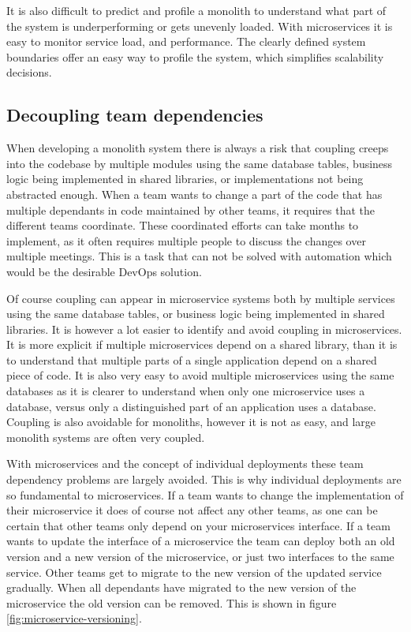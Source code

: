\documentclass[a4paper]{article}
\begin{document}
It is also difficult to predict and profile a monolith to understand what part of the system is underperforming or gets unevenly loaded. With microservices it is easy to monitor service load, and performance. The clearly defined system boundaries offer an easy way to profile the system, which simplifies scalability decisions.

\subsection{Decoupling team dependencies}
\label{sec:benefits:team-dependencies}
When developing a monolith system there is always a risk that coupling creeps into the codebase by multiple modules using the same database tables, business logic being implemented in shared libraries, or implementations not being abstracted enough. When a team wants to change a part of the code that has multiple dependants in code maintained by other teams, it requires that the different teams coordinate. These coordinated efforts can take months to implement, as it often requires multiple people to discuss the changes over multiple meetings. This is a task that can not be solved with automation which would be the desirable DevOps solution.

Of course coupling can appear in microservice systems both by multiple services using the same database tables, or business logic being implemented in shared libraries. It is however a lot easier to identify and avoid coupling in microservices. It is more explicit if multiple microservices depend on a shared library, than it is to understand that multiple parts of a single application depend on a shared piece of code. \pagebreak It is also very easy to avoid multiple microservices using the same databases as it is clearer to understand when only one microservice uses a database, versus only a distinguished part of an application uses a database. Coupling is also avoidable for monoliths, however it is not as easy, and large monolith systems are often very coupled.

With microservices and the concept of individual deployments these team dependency problems are largely avoided. This is why individual deployments are so fundamental to microservices. If a team wants to change the implementation of their microservice it does of course not affect any other teams, as one can be certain that other teams only depend on your microservices interface. If a team wants to update the interface of a microservice the team can deploy both an old version and a new version of the microservice, or just two interfaces to the same service. Other teams get to migrate to the new version of the updated service gradually. When all dependants have migrated to the new version of the microservice the old version can be removed. This is shown in figure \ref{fig:microservice-versioning}.
\end{document}
